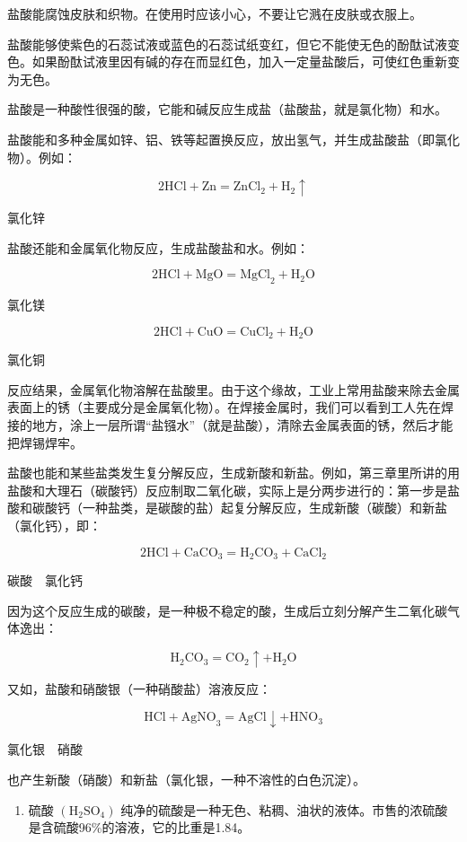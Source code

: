 盐酸能腐蚀皮肤和织物。在使用时应该小心，不要让它溅在皮肤或衣服上。

盐酸能够使紫色的石蕊试液或蓝色的石蕊试纸变红，但它不能使无色的酚酞试液变色。如果酚酞试液里因有碱的存在而显红色，加入一定量盐酸后，可使红色重新变为无色。

盐酸是一种酸性很强的酸，它能和碱反应生成盐（盐酸盐，就是氯化物）和水。

盐酸能和多种金属如锌、铝、铁等起置换反应，放出氢气，并生成盐酸盐（即氯化物）。例如：

\[
2 \mathrm{HCl} + \mathrm{Zn} = \mathrm{ZnCl}_{2} + \mathrm{H}_{2} \uparrow
\]

氯化锌

盐酸还能和金属氧化物反应，生成盐酸盐和水。例如：

\[
2 \mathrm{HCl} + \mathrm{MgO} = \mathrm{MgCl}_{2} + \mathrm{H}_{2} \mathrm{O}
\]

氯化镁

\[
2 \mathrm{HCl} + \mathrm{CuO} = \mathrm{CuCl}_{2} + \mathrm{H}_{2} \mathrm{O}
\]

氯化铜

反应结果，金属氧化物溶解在盐酸里。由于这个缘故，工业上常用盐酸来除去金属表面上的锈（主要成分是金属氧化物）。在焊接金属时，我们可以看到工人先在焊接的地方，涂上一层所谓``盐镪水''（就是盐酸），清除去金属表面的锈，然后才能把焊锡焊牢。

盐酸也能和某些盐类发生复分解反应，生成新酸和新盐。例如，第三章里所讲的用盐酸和大理石（碳酸钙）反应制取二氧化碳，实际上是分两步进行的：第一步是盐酸和碳酸钙（一种盐类，是碳酸的盐）起复分解反应，生成新酸（碳酸）和新盐
（氯化钙），即：

\[
2 \mathrm{HCl} + \mathrm{CaCO}_{3} = \mathrm{H}_{2} \mathrm{CO}_{3} + \mathrm{CaCl}_{2}
\]

碳酸　氯化钙

因为这个反应生成的碳酸，是一种极不稳定的酸，生成后立刻分解产生二氧化碳气体逸出：

\[
\mathrm{H}_{2} \mathrm{CO}_{3} = \mathrm{CO}_{2} \uparrow + \mathrm{H}_{2} \mathrm{O}
\]

又如，盐酸和硝酸银（一种硝酸盐）溶液反应：

\[
\mathrm{HCl} + \mathrm{AgNO}_{3} = \mathrm{AgCl} \downarrow + \mathrm{HNO}_{3}
\]

氯化银　硝酸

也产生新酸（硝酸）和新盐（氯化银，一种不溶性的白色沉淀）。

\begin{enumerate}[start=2]
\item
  硫酸 \(\left(\mathrm{H}_{2}\mathrm{SO}_{4}\right)\)
  纯净的硫酸是一种无色、粘稠、油状的液体。市售的浓硫酸是含硫酸96\%的溶液，它的比重是1.84。
\end{enumerate}

